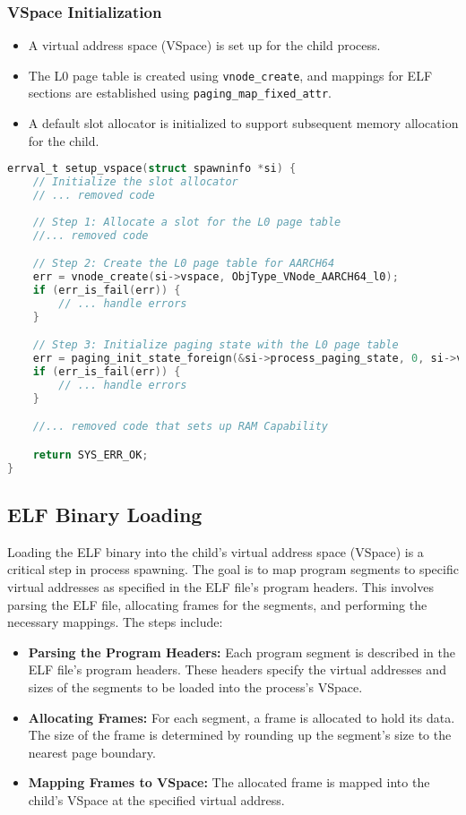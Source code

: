 \subsubsection*{VSpace Initialization}
\begin{itemize}
    \item A virtual address space (VSpace) is set up for the child process.
    \item The L0 page table is created using \texttt{vnode\_create}, and mappings for ELF sections are established using \texttt{paging\_map\_fixed\_attr}.
    \item A default slot allocator is initialized to support subsequent memory allocation for the child.
\end{itemize}

\begin{lstlisting}[caption={Setting up the VSpace for the child process}, label=lst:vspace_setup, language=C]
errval_t setup_vspace(struct spawninfo *si) {
    // Initialize the slot allocator
    // ... removed code
    
    // Step 1: Allocate a slot for the L0 page table
    //... removed code

    // Step 2: Create the L0 page table for AARCH64
    err = vnode_create(si->vspace, ObjType_VNode_AARCH64_l0);
    if (err_is_fail(err)) {
        // ... handle errors
    }

    // Step 3: Initialize paging state with the L0 page table
    err = paging_init_state_foreign(&si->process_paging_state, 0, si->vspace, &si->default_sa.a);
    if (err_is_fail(err)) {
        // ... handle errors
    }

    //... removed code that sets up RAM Capability

    return SYS_ERR_OK;
}
\end{lstlisting}

\subsection*{ELF Binary Loading}
Loading the ELF binary into the child's virtual address space (VSpace) is a critical step in process spawning. The goal is to map program segments to specific virtual addresses as specified in the ELF file's program headers. This involves parsing the ELF file, allocating frames for the segments, and performing the necessary mappings. The steps include:

\begin{itemize}
    \item \textbf{Parsing the Program Headers:} Each program segment is described in the ELF file's program headers. These headers specify the virtual addresses and sizes of the segments to be loaded into the process's VSpace.
    \item \textbf{Allocating Frames:} For each segment, a frame is allocated to hold its data. The size of the frame is determined by rounding up the segment's size to the nearest page boundary.
    \item \textbf{Mapping Frames to VSpace:} The allocated frame is mapped into the child's VSpace at the specified virtual address.
\end{itemize}

